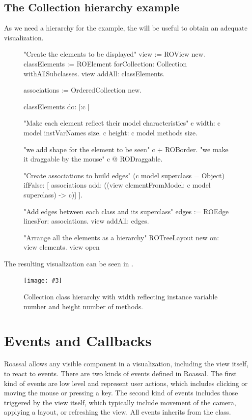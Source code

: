 \documentclass[a4paper,10pt,twoside]{book}
\newcommand{\fig}[4]{
		\begin{figure}[#1]
			\centering
			\texttt{[image: \#3]}
			\caption{\label{fig:#3}#4}
		\end{figure}}
\begin{document}
\subsection*{The Collection hierarchy example}

As we need a hierarchy for the  example, the  will be useful to obtain an adequate visualization.

\begin{figure}[H]
\begin{code}{}

"Create the elements to be displayed"
view := ROView new.
classElements := ROElement forCollection: Collection withAllSubclasses.
view addAll: classElements.

associations := OrderedCollection new.

classElements do: [:c | 

	"Make each element reflect their model characteristics"
	c width: c model instVarNames size.
	c height: c model methods size.
	
	"we add shape for the element to be seen"
	c + ROBorder. 
	"we make it draggable by the mouse"
	c @ RODraggable.
	
	"Create associations to build edges"
	(c model superclass = Object)
		ifFalse: [ associations add: ((view elementFromModel: c model superclass) -> c)]	
	 ].
	 
"Add edges between each class and its superclass"
edges := ROEdge linesFor: associations.
view addAll: edges.

"Arrange all the elements as a hierarchy"
ROTreeLayout new on: view elements.
view open
\end{code}
\end{figure}

The resulting visualization can be seen in .

\fig{H}{0.4}{collectionHierarchy}{Collection class hierarchy with width reflecting instance variable number and height number of methods.}


\section{Events and Callbacks}

Roassal allows any visible component in a visualization, including the view itself, to react to events. There are two kinds of events defined in Roassal. The first kind of events are low level and represent user actions, which includes clicking or moving the mouse or pressing a key. The second kind of events includes those triggered by the view itself, which typically include movement of the camera, applying a layout, or refreshing the view. All events inherits from the  class.
\end{document}

